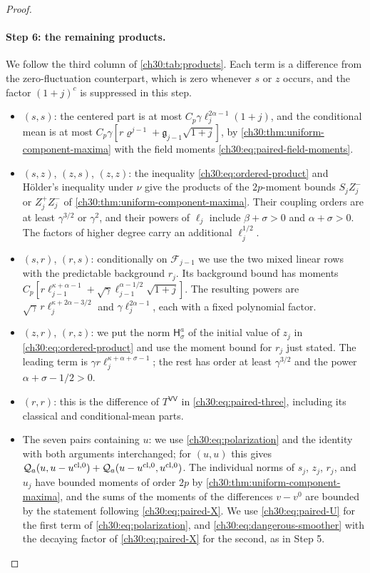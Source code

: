 \begin{proof}
\paragraph{Step 6: the remaining products.} We follow the third column of \cref{ch30:tab:products}. Each term is a difference from the zero-fluctuation counterpart, which is zero whenever $s$ or $z$ occurs, and the factor $(1+j)^c$ is suppressed in this step.
\begin{itemize}
\item $(s,s)$: the centered part is at most $C_p\gamma\ell_j^{2\alpha-1}(1+j)$, and the conditional mean is at most $C_p\gamma[r\varrho^{j-1}+\mathfrak g_{j-1}\sqrt{1+j}]$, by \cref{ch30:thm:uniform-component-maxima} with the field moments \eqref{ch30:eq:paired-field-moments}.
\item $(s,z)$, $(z,s)$, $(z,z)$: the inequality \eqref{ch30:eq:ordered-product} and H\"older's inequality under $\nu$ give the products of the $2p$-moment bounds $S_jZ_j^-$ or $Z_j^+Z_j^-$ of \cref{ch30:thm:uniform-component-maxima}. Their coupling orders are at least $\gamma^{3/2}$ or $\gamma^2$, and their powers of $\ell_j$ include $\beta+\sigma>0$ and $\alpha+\sigma>0$. The factors of higher degree carry an additional $\ell_j^{1/2}$.
\item $(s,r)$, $(r,s)$: conditionally on $\mathcal F_{j-1}$ we use the two mixed linear rows with the predictable background $r_j$. Its background bound has moments $C_p[r\ell_{j-1}^{\kappa+\alpha-1}+\sqrt\gamma\ell_{j-1}^{\alpha-1/2}\sqrt{1+j}]$. The resulting powers are $\sqrt\gamma\,r\ell_j^{\kappa+2\alpha-3/2}$ and $\gamma\ell_j^{2\alpha-1}$, each with a fixed polynomial factor.
\item $(z,r)$, $(r,z)$: we put the norm $\mathsf H_\sigma^a$ of the initial value of $z_j$ in \eqref{ch30:eq:ordered-product} and use the moment bound for $r_j$ just stated. The leading term is $\gamma r\ell_j^{\kappa+\alpha+\sigma-1}$; the rest has order at least $\gamma^{3/2}$ and the power $\alpha+\sigma-1/2>0$.
\item $(r,r)$: this is the difference of $T^{\mathsf{VV}}$ in \eqref{ch30:eq:paired-three}, including its classical and conditional-mean parts.
\item The seven pairs containing $u$: we use \eqref{ch30:eq:polarization} and the identity with both arguments interchanged; for $(u,u)$ this gives $\mathcal Q_{a}(u,u-u^{\mathrm{cl},0})+\mathcal Q_{a}(u-u^{\mathrm{cl},0},u^{\mathrm{cl},0})$. The individual norms of $s_j$, $z_j$, $r_j$, and $u_j$ have bounded moments of order $2p$ by \cref{ch30:thm:uniform-component-maxima}, and the sums of the moments of the differences $v-v^0$ are bounded by the statement following \eqref{ch30:eq:paired-X}. We use \eqref{ch30:eq:paired-U} for the first term of \eqref{ch30:eq:polarization}, and \eqref{ch30:eq:dangerous-smoother} with the decaying factor of \eqref{ch30:eq:paired-X} for the second, as in Step 5.

\end{itemize}
\end{proof}
